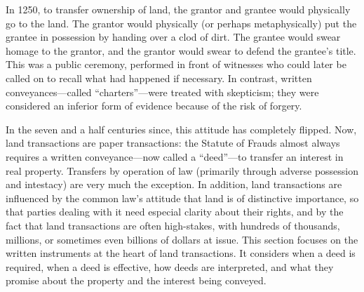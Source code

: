 In 1250, to transfer ownership of land, the grantor and grantee would physically
go to the land. The grantor would physically (or perhaps metaphysically) put
the grantee in possession by handing over a clod of dirt. The grantee would
swear homage to the grantor, and the grantor would swear to defend the
grantee's title. This was a public ceremony, performed in front of witnesses
who could later be called on to recall what had happened if necessary. In
contrast, written conveyances---called ``charters''---were treated with
skepticism; they were considered an inferior form of evidence because of the
risk of forgery.

In the seven and a half centuries since, this attitude has completely flipped.
Now, land transactions are paper transactions: the Statute of Frauds almost
always requires a written conveyance---now called a ``deed''---to transfer an
interest in real property. Transfers by operation of law (primarily through
adverse possession and intestacy) are very much the exception. In addition,
land transactions are influenced by the common law's attitude that land is of
distinctive importance, so that parties dealing with it need especial clarity
about their rights, and by the fact that land transactions are often
high-stakes, with hundreds of thousands, millions, or sometimes even billions
of dollars at issue. This section focuses on the written instruments at the
heart of land transactions. It considers when a deed is required, when a deed
is effective, how deeds are interpreted, and what they promise about the
property and the interest being conveyed.


